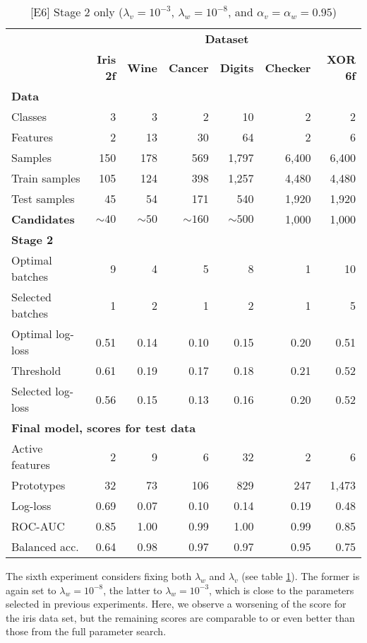 \begin{table}
\caption{[E6] Stage 2 only ($\lambda_v=10^{-3}$, $\lambda_w=10^{-8}$, and $\alpha_v=\alpha_w=0.95$)}
\label{tab_e6}
%
\begin{center}
\small
\begin{tabular}{|lrrrrrr|}
\hline
&\multicolumn{6}{c|}{\textbf{\hrulefill\ Dataset \hrulefill}}\\
&\textbf{Iris 2f}&\textbf{Wine}&\textbf{Cancer}&\textbf{Digits}&\textbf{Checker}&\textbf{XOR 6f}\\
\multicolumn{7}{|l|}{\textbf{Data}}\\
Classes&3&3&2&10&2&2\\
Features&2&13&30&64&2&6\\
Samples&150&178&569&1,797&6,400&6,400\\
Train samples&105&124&398&1,257&4,480&4,480\\
Test samples&45&54&171&540&1,920&1,920\\
\textbf{Candidates}&$\sim40$&$\sim50$&$\sim160$&$\sim500$&1,000&1,000\\
\multicolumn{7}{|l|}{\textbf{Stage 2}}\\
Optimal batches&9&4&5&8&1&10\\
Selected batches&1&2&1&2&1&5\\
Optimal log-loss&0.51&0.14&0.10&0.15&0.20&0.51\\
Threshold&0.61&0.19&0.17&0.18&0.21&0.52\\
Selected log-loss&0.56&0.15&0.13&0.16&0.20&0.52\\
\multicolumn{7}{|l|}{\textbf{Final model, scores for test data}}\\
Active features&2&9&6&32&2&6\\
Prototypes&32&73&106&829&247&1,473\\
Log-loss&0.69&0.07&0.10&0.14&0.19&0.48\\
ROC-AUC&0.85&1.00&0.99&1.00&0.99&0.85\\
Balanced acc.&0.64&0.98&0.97&0.97&0.95&0.75\\
\hline
\end{tabular}
\end{center}
\end{table}
%
The sixth experiment considers fixing both $\lambda_w$ and $\lambda_v$ (see table \ref{tab_e6}).
The former is again set to $\lambda_w=10^{-8}$, the latter to $\lambda_w=10^{-3}$, which is close to the parameters selected in previous experiments.
Here, we observe a worsening of the score for the iris data set, but the remaining scores are comparable to or even better than those from the full parameter search.
